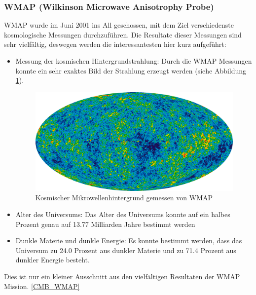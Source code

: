 \subsubsection{WMAP (Wilkinson Microwave Anisotrophy Probe)}
WMAP wurde im Juni 2001 ins All geschossen, mit dem Ziel verschiedenste 
kosmologische Messungen durchzuführen.
Die Resultate dieser Messungen sind sehr vielfältig, deswegen werden die 
interessantesten hier kurz aufgeführt:
\begin{itemize}
	\item Messung der kosmischen Hintergrundstrahlung: Durch die WMAP Messungen 
	konnte ein sehr exaktes Bild der Strahlung erzeugt werden (siehe Abbildung 
	\ref{fig:CMB_WMAP}).
	\begin{figure}
		\includegraphics[width=\linewidth]{cmb/images/CMB_WMAP.png}
		\caption{Kosmischer Mikrowellenhintergrund gemessen von WMAP}
		\label{fig:CMB_WMAP}
	\end{figure}
	\item Alter des Universums: Das Alter des Universums konnte auf ein halbes 
	Prozent genau auf 13.77 Milliarden Jahre bestimmt werden
	\item Dunkle Materie und dunkle Energie: Es konnte bestimmt werden, dass 
	das Universum zu 24.0 Prozent aus dunkler Materie und zu 71.4 Prozent aus 
	dunkler Energie besteht.
\end{itemize}
Dies ist nur ein kleiner Ausschnitt aus den vielfältigen Resultaten der 
WMAP Mission. \ref{CMB_WMAP}

